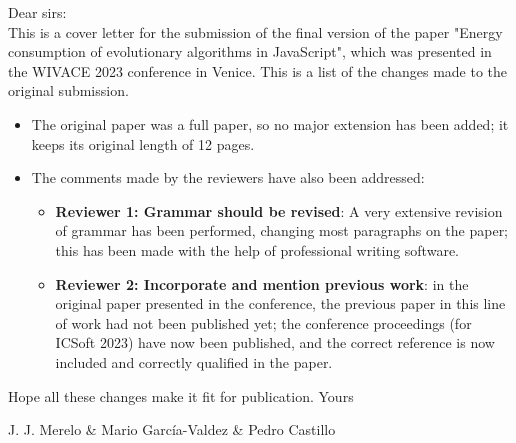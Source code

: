 \documentclass[11pt]{article}
\begin{document}
Dear sirs:\\

This is a cover letter for the submission of the final version of the paper
"Energy consumption of evolutionary algorithms in JavaScript", which was presented in the WIVACE 2023 conference in Venice. This is a list of the changes made to the original submission.\begin{itemize}
\item The original paper was a full paper, so no major extension has been added;
  it keeps its original length of 12 pages.
\item The comments made by the reviewers have also been addressed:\begin{itemize}
  \item \textbf{Reviewer 1: Grammar should be revised}: A very extensive
    revision of grammar has been performed, changing most paragraphs on the
    paper; this has been made with the help of professional writing software.
  \item \textbf{Reviewer 2: Incorporate and mention previous work}: in the
    original paper presented in the conference, the previous paper in this line
    of work had not been published yet; the conference proceedings (for ICSoft
    2023) have now been published, and the correct reference is now included and
    correctly qualified in the paper.
  \end{itemize}
  \end{itemize}

Hope all these changes make it fit for publication. Yours\\


\centerline{J. J. Merelo \& Mario García-Valdez \& Pedro Castillo}
\end{document}
